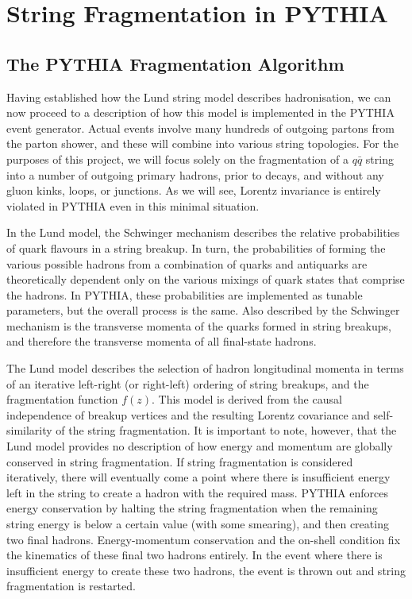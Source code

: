 \documentclass[12pt,a4paper]{report}
\begin{document}
\chapter{String Fragmentation in PYTHIA}
\label{chap:fragmentation}
\section{The PYTHIA Fragmentation Algorithm}
Having established how the Lund string model describes hadronisation, we can now proceed to a description of how this model is implemented in the PYTHIA event generator. Actual events involve many hundreds of outgoing partons from the parton shower, and these will combine into various string topologies. For the purposes of this project, we will focus solely on the fragmentation of a $q\bar{q}$ string into a number of outgoing primary hadrons, prior to decays, and without any gluon kinks, loops, or junctions. As we will see, Lorentz invariance is entirely violated in PYTHIA even in this minimal situation.

In the Lund model, the Schwinger mechanism describes the relative probabilities of quark flavours in a string breakup. In turn, the probabilities of forming the various possible hadrons from a combination of quarks and antiquarks are theoretically dependent only on the various mixings of quark states that comprise the hadrons. In PYTHIA, these probabilities are implemented as tunable parameters, but the overall process is the same. Also described by the Schwinger mechanism is the transverse momenta of the quarks formed in string breakups, and therefore the transverse momenta of all final-state hadrons.

The Lund model describes the selection of hadron longitudinal momenta in terms of an iterative left-right (or right-left) ordering of string breakups, and the fragmentation function $f(z)$. This model is derived from the causal independence of breakup vertices and the resulting Lorentz covariance and self-similarity of the string fragmentation. It is important to note, however, that the Lund model provides no description of how energy and momentum are globally conserved in string fragmentation. If string fragmentation is considered iteratively, there will eventually come a point where there is insufficient energy left in the string to create a hadron with the required mass. PYTHIA enforces energy conservation by halting the string fragmentation when the remaining string energy is below a certain value (with some smearing), and then creating two final hadrons. Energy-momentum conservation and the on-shell condition fix the kinematics of these final two hadrons entirely. In the event where there is insufficient energy to create these two hadrons, the event is thrown out and string fragmentation is restarted.
\end{document}

